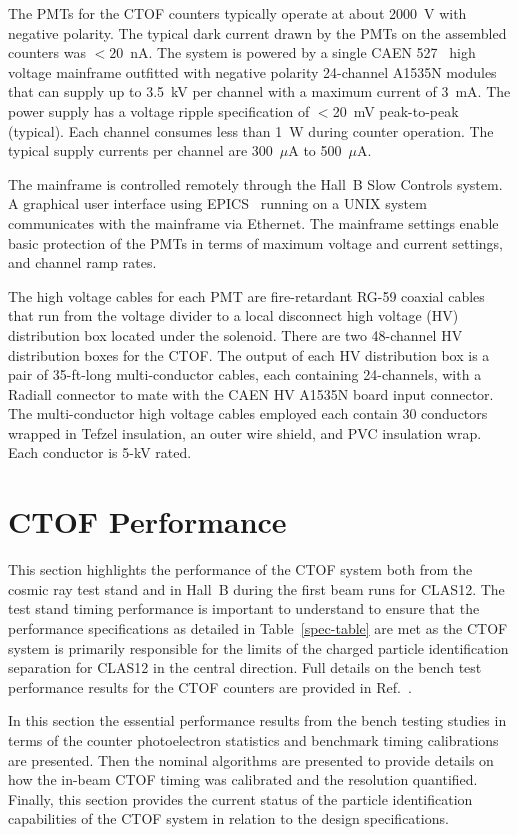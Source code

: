 \documentclass{elsart}
\begin{document}
The PMTs for the CTOF counters typically operate at about 2000~V with negative polarity. The typical
dark current drawn by the PMTs on the assembled counters was $<20$~nA. The system is powered by a
single CAEN 527~\cite{caen-527} high voltage mainframe outfitted with negative polarity 24-channel
A1535N modules that can supply up to 3.5~kV per channel with a maximum current of 3~mA. The power
supply has a voltage ripple specification of $<$20~mV peak-to-peak (typical). Each channel consumes less
than 1~W during counter operation. The typical supply currents per channel are 300~$\mu$A to
500~$\mu$A.

The mainframe is controlled remotely through the Hall~B Slow Controls system. A graphical user interface
using EPICS~\cite{epics} running on a UNIX system communicates with the mainframe via Ethernet. The
mainframe settings enable basic protection of the PMTs in terms of maximum voltage and current settings,
and channel ramp rates.

The high voltage cables for each PMT are fire-retardant RG-59 coaxial cables that run from the voltage
divider to a local disconnect high voltage (HV) distribution box located under the solenoid. There are two
48-channel HV distribution boxes for the CTOF. The output of each HV distribution box is a pair of 
35-ft-long multi-conductor cables, each containing 24-channels, with a Radiall connector to mate with the
CAEN HV A1535N board input connector. The multi-conductor high voltage cables employed each contain
30 conductors wrapped in Tefzel insulation, an outer wire shield, and PVC insulation wrap. Each conductor
is 5-kV rated.

\section{CTOF Performance}
\label{sec:performance}

This section highlights the performance of the CTOF system both from the cosmic ray test stand
and in Hall~B during the first beam runs for CLAS12. The test stand timing performance is important
to understand to ensure that the performance specifications as detailed in Table~\ref{spec-table} are
met as the CTOF system is primarily responsible for the limits of the charged particle identification
separation for CLAS12 in the central direction. Full details on the bench test performance results for
the CTOF counters are provided in Ref.~\cite{dsc-cn2016-009}.

In this section the essential performance results from the bench testing studies in terms of the counter
photoelectron statistics and benchmark timing calibrations are presented. Then the nominal algorithms
are presented to provide details on how the in-beam CTOF timing was calibrated and the resolution
quantified. Finally, this section provides the current status of the particle identification capabilities
of the CTOF system in relation to the design specifications.
\end{document}
